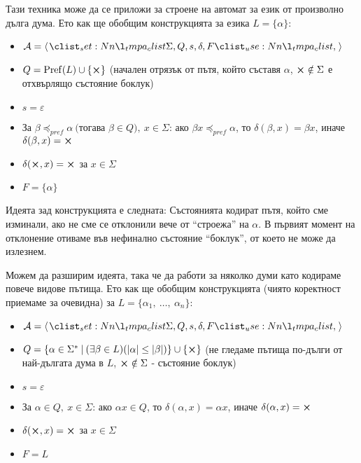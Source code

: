 Тази техника може да се приложи за строене на автомат за език от произволно дълга дума.
Ето как ще обобщим конструкцията за езика $L = \{ \alpha \}$:
\begin{itemize}
    \item $\mathcal{A} = \opair{\Sigma, Q, s, \delta, F}$
    \item $Q = \operatorname{Pref}(L) \cup \{ \cross \}$ (начален отрязък от пътя, който съставя $\alpha$, $\cross \notin \Sigma$ е отхвърлящо състояние боклук)
    \item $s = \varepsilon$
    \item За $\beta \preceq_{pref} \alpha \: ($тогава $\beta \in Q), \: x \in \Sigma$:
          ако $\beta x \preceq_{pref} \alpha$, то $\delta(\beta, x) = \beta x$,
          иначе $\delta(\beta, x) = \cross$
    \item $\delta(\cross, x) = \cross$ за $x \in \Sigma$
    \item $F = \{ \alpha \}$
\end{itemize}

Идеята зад конструкцията е следната:
Състоянията кодират пътя, който сме изминали, ако не сме се отклонили вече от ``строежа'' на $\alpha$.
В първият момент на отклонение отиваме във нефинално състояние ``боклук'', от което не може да излезнем.

Можем да разширим идеята, така че да работи за няколко думи като кодираме повече видове пътища.
Ето как ще обобщим конструкцията (чиято коректност приемаме за очевидна) за $L = \{ \alpha_1, \: \dots, \: \alpha_n \}$:
\begin{itemize}
    \item $\mathcal{A} = \opair{\Sigma, Q, s, \delta, F}$
    \item $Q = \{ \alpha \in \Sigma^* \: | \: (\exists \beta \in L) (|\alpha| \leq |\beta|) \} \cup \{ \cross \}$ (не гледаме пътища по-дълги от най-дългата дума в $L$, $\cross \notin \Sigma$ - състояние боклук)
    \item $s = \varepsilon$
    \item За $\alpha \in Q, \: x \in \Sigma$:
          ако $\alpha x \in Q$, то $\delta(\alpha, x) = \alpha x$,
          иначе $\delta(\alpha, x) = \cross$
    \item $\delta(\cross, x) = \cross$ за $x \in \Sigma$
    \item $F = L$
\end{itemize}

